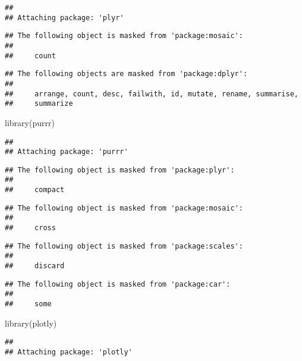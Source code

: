 \documentclass[
]{article}
\newenvironment{Shaded}{\begin{snugshade}}{\end{snugshade}}
\newcommand{\FunctionTok}[1]{\textcolor[rgb]{0.00,0.00,0.00}{#1}}
\newcommand{\NormalTok}[1]{#1}
\begin{document}
\begin{verbatim}
## 
## Attaching package: 'plyr'
\end{verbatim}

\begin{verbatim}
## The following object is masked from 'package:mosaic':
## 
##     count
\end{verbatim}

\begin{verbatim}
## The following objects are masked from 'package:dplyr':
## 
##     arrange, count, desc, failwith, id, mutate, rename, summarise,
##     summarize
\end{verbatim}

\begin{Shaded}
\begin{Highlighting}[]
\FunctionTok{library}\NormalTok{(purrr)}
\end{Highlighting}
\end{Shaded}

\begin{verbatim}
## 
## Attaching package: 'purrr'
\end{verbatim}

\begin{verbatim}
## The following object is masked from 'package:plyr':
## 
##     compact
\end{verbatim}

\begin{verbatim}
## The following object is masked from 'package:mosaic':
## 
##     cross
\end{verbatim}

\begin{verbatim}
## The following object is masked from 'package:scales':
## 
##     discard
\end{verbatim}

\begin{verbatim}
## The following object is masked from 'package:car':
## 
##     some
\end{verbatim}

\begin{Shaded}
\begin{Highlighting}[]
\FunctionTok{library}\NormalTok{(plotly)}
\end{Highlighting}
\end{Shaded}

\begin{verbatim}
## 
## Attaching package: 'plotly'
\end{verbatim}
\end{document}

